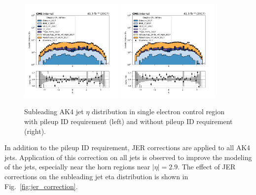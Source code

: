 \begin{figure}[htbp]
  \centering
        \includegraphics[width=0.45\textwidth]{fig/datamc/puid_comparison/cr_1e_vbf_ak4_eta1_losf_2017_puid.png}
        \includegraphics[width=0.45\textwidth]{fig/datamc/puid_comparison/cr_1e_vbf_ak4_eta1_losf_2017_nopuid.png}
  \caption{Subleading AK4 jet $\eta$ distribution in single electron control region with pileup ID requirement (left) 
  and without pileup ID requirement (right).}
  \label{fig:pileupid}
\end{figure}

In addition to the pileup ID requirement, JER corrections are applied to all AK4 jets. Application of this correction on all 
jets is observed to improve the modeling of the jets, especially near the horn regions near $|\eta| = 2.9$. The effect of JER 
corrections on the subleading jet eta distribution is shown in Fig.~\ref{fig:jer_correction}.


